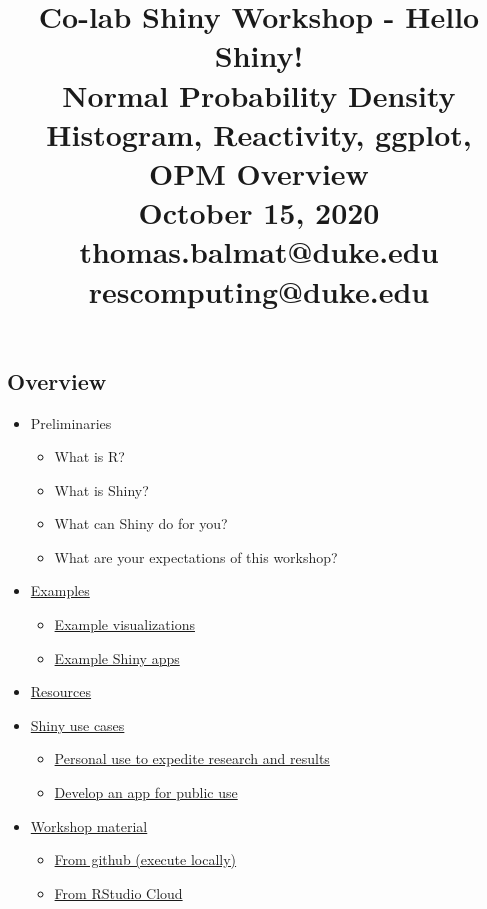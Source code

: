 \documentclass[10pt, letterpaper]{article}
\title{\Large Co-lab Shiny Workshop - Hello Shiny!\\[6pt]
       \large Normal Probability Density Histogram, Reactivity, ggplot, OPM Overview\\[6pt]
       October 15, 2020\\[20pt]
       \normalsize thomas.balmat@duke.edu\\[1pt]rescomputing@duke.edu}
\date{}
\begin{document}
    
\begin{spacing}{1.0}
    
\maketitle


\section{Overview}

\begin{itemize}
    \item Preliminaries
      \begin{itemize}
        \item What is R?
        \item What is Shiny?
        \item What can Shiny do for you?
        \item What are your expectations of this workshop?
      \end{itemize}
    \item \hyperref[sec:examples]{Examples}
      \begin{itemize}
        \item \hyperref[sec:examplevis]{Example visualizations}
        \item \hyperref[sec:exampleapps]{Example Shiny apps}
      \end{itemize}
    \item \hyperref[sec:resources]{Resources}
    \item \hyperref[sec:usecases]{Shiny use cases}
      \begin{itemize}
        \item \hyperref[sec:usecase1]{Personal use to expedite research and results}
        \item \hyperref[sec:usecase2]{Develop an app for public use}
      \end{itemize}
    \item \hyperref[sec:accesworkshopmaterial]{Workshop material}
      \begin{itemize}
        \item \hyperref[sec:materialgit]{From github (execute locally)}
        \item \hyperref[sec:materialcloud]{From RStudio Cloud}

\end{itemize}
\end{itemize}
\end{spacing}
\end{document}
